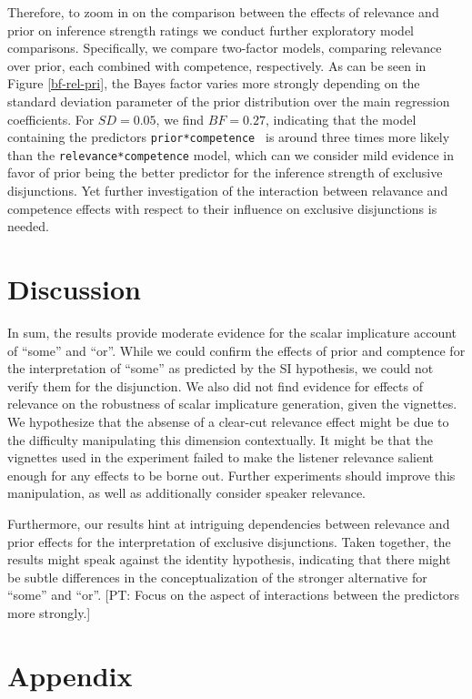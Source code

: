 \documentclass{sp}
\newcommand{\pt}[1]{\textcolor{Cerulean}{[PT: #1]}}
\begin{document}
Therefore, to zoom in on the comparison between the effects of relevance and prior on inference strength ratings we conduct further exploratory model comparisons. Specifically, we compare two-factor models, comparing relevance over prior, each combined with competence, respectively. As can be seen in Figure \ref{bf-rel-pri}, the Bayes factor varies more strongly depending on the standard deviation parameter of the prior distribution over the main regression coefficients. For $SD=0.05$, we find $BF=0.27$, indicating that the model containing  the predictors \texttt{prior*competence } is around three times more likely than the \texttt{relevance*competence} model, which can we consider mild evidence in favor of prior being the better predictor for the inference strength of exclusive disjunctions. 
Yet further investigation of the interaction between relavance and competence effects with respect to their influence on exclusive disjunctions is needed.
 
\section{Discussion}
In sum, the results provide moderate evidence for the scalar implicature account of ``some'' and ``or''. While we could confirm the effects of prior and comptence for the interpretation of ``some'' as predicted by the SI hypothesis, we could not verify them for the disjunction. We also did not find evidence for effects of relevance on the robustness of scalar implicature generation, given the vignettes. We hypothesize that the absense of a clear-cut relevance effect might be due to the difficulty manipulating this dimension contextually. It might be that the vignettes used in the experiment failed to make the listener relevance salient enough for any effects to be borne out. Further experiments should improve this manipulation, as well as additionally consider speaker relevance.

Furthermore, our results hint at intriguing dependencies between relevance and prior effects for the interpretation of exclusive disjunctions. Taken together, the results might speak against the identity hypothesis, indicating that there might be subtle differences in the conceptualization of the stronger alternative for ``some'' and ``or''. \pt{Focus on the aspect of interactions between the predictors more strongly.}

\section{Appendix}
\end{document}
